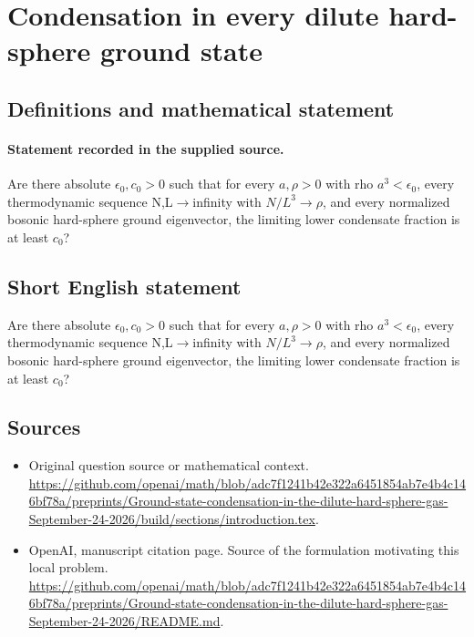 \documentclass[11pt]{article}
\begin{document}
\section*{Condensation in every dilute hard-sphere ground state}\label{30007227}
\subsection{Definitions and mathematical statement}
\paragraph{Statement recorded in the supplied source.}
Are there absolute $\epsilon _0,c_0>0$ such that for every $a,\rho >0$ with rho $a^3<\epsilon _0$, every thermodynamic sequence N,L$\to$infinity with $N/L^3\to \rho $, and every normalized bosonic hard-sphere ground eigenvector, the limiting lower condensate fraction is at least $c_0$?
\subsection{Short English statement}
Are there absolute $\epsilon _0,c_0>0$ such that for every $a,\rho >0$ with rho $a^3<\epsilon _0$, every thermodynamic sequence N,L$\to$infinity with $N/L^3\to \rho $, and every normalized bosonic hard-sphere ground eigenvector, the limiting lower condensate fraction is at least $c_0$?
\subsection{Sources}
\begin{itemize}
\item[S1] Original question source or mathematical context.
\url{https://github.com/openai/math/blob/adc7f1241b42e322a6451854ab7e4b4c146bf78a/preprints/Ground-state-condensation-in-the-dilute-hard-sphere-gas-September-24-2026/build/sections/introduction.tex}.
\item[S2] OpenAI, manuscript citation page. Source of the formulation motivating this local problem.
\url{https://github.com/openai/math/blob/adc7f1241b42e322a6451854ab7e4b4c146bf78a/preprints/Ground-state-condensation-in-the-dilute-hard-sphere-gas-September-24-2026/README.md}.
\end{itemize}
\end{document}
